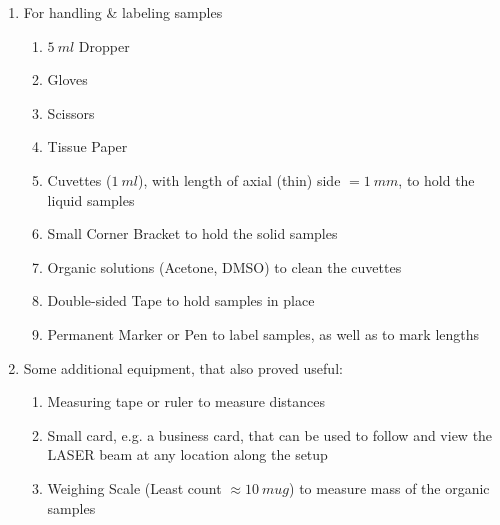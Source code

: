 \documentclass[%
 reprint,
amsmath,
amssymb,
10pt
]{revtex4-2}
\begin{document}
\begin{enumerate}
\begin{enumerate}
    \end{enumerate}
    \item For handling \& labeling samples
    \begin{enumerate}
        \item $5\:ml$ Dropper
        \item Gloves
        \item Scissors
        \item Tissue Paper
        \item Cuvettes ($1\:ml$), with length of axial (thin) side $=1\:mm$, to hold the liquid samples
        \item Small Corner Bracket to hold the solid samples
        \item Organic solutions (Acetone, DMSO) to clean the cuvettes
        \item Double-sided Tape to hold samples in place
        \item Permanent Marker or Pen to label samples, as well as to mark lengths
    \end{enumerate}
    \item Some additional equipment, that also proved useful:
    \begin{enumerate}
        \item Measuring tape or ruler to measure distances
        \item Small card, e.g. a business card, that can be used to follow and view the LASER beam at any location along the setup
        \item Weighing Scale (Least count $\approx 10\:mu g$) to measure mass of the organic samples
    \end{enumerate}
\end{enumerate}
\end{document}
